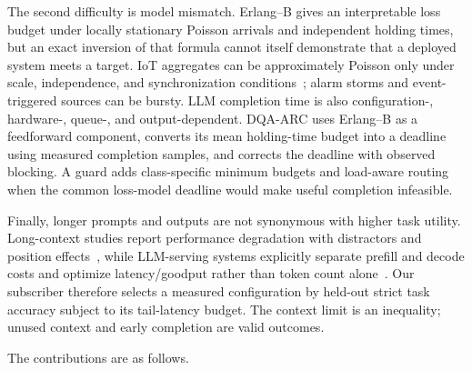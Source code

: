 \documentclass[journal]{IEEEtran}
\newcommand{\method}{DQA-ARC}
\begin{document}
The second difficulty is model mismatch. Erlang--B gives an interpretable loss budget under locally stationary Poisson arrivals and independent holding times, but an exact inversion of that formula cannot itself demonstrate that a deployed system meets a target. IoT aggregates can be approximately Poisson only under scale, independence, and synchronization conditions~\cite{metzger2019modeling,lopez2020aggregated}; alarm storms and event-triggered sources can be bursty. LLM completion time is also configuration-, hardware-, queue-, and output-dependent. \method{} uses Erlang--B as a feedforward component, converts its mean holding-time budget into a deadline using measured completion samples, and corrects the deadline with observed blocking. A guard adds class-specific minimum budgets and load-aware routing when the common loss-model deadline would make useful completion infeasible.

Finally, longer prompts and outputs are not synonymous with higher task utility. Long-context studies report performance degradation with distractors and position effects~\cite{liu2024lost,hsieh2024ruler}, while LLM-serving systems explicitly separate prefill and decode costs and optimize latency/goodput rather than token count alone~\cite{kwon2023vllm,agrawal2024sarathi,zhong2024distserve}. Our subscriber therefore selects a measured configuration by held-out strict task accuracy subject to its tail-latency budget. The context limit is an inequality; unused context and early completion are valid outcomes.

The contributions are as follows.
\end{document}
